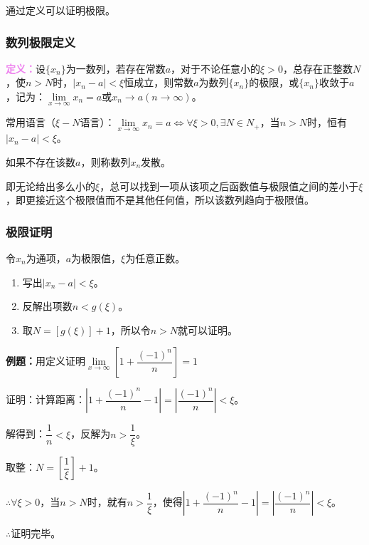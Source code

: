 \documentclass[UTF8, 12pt]{ctexart}
\begin{document}
        通过定义可以证明极限。

        \subsubsection{数列极限定义}

        \textcolor{violet}{\textbf{定义：}}设$\{x_n\}$为一数列，若存在常数$a$，对于不论任意小的$\xi>0$，总存在正整数$N$，使$n>N$时，$\vert x_n-a\vert<\xi$恒成立，则常数$a$为数列$\{x_n\}$的极限，或$\{x_n\}$收敛于$a$，记为：$\lim\limits_{x\to\infty}x_n=a$或$x_n\to a(n\to\infty)$。

        常用语言（$\xi-N$语言）：$\lim\limits_{x\to\infty}x_n=a\Leftrightarrow\forall\xi>0,\exists N\in N_+$，当$n>N$时，恒有$\vert x_n-a\vert<\xi$。

        如果不存在该数$a$，则称数列$x_n$发散。

        即无论给出多么小的$\xi$，总可以找到一项从该项之后函数值与极限值之间的差小于$\xi$，即更接近这个极限值而不是其他任何值，所以该数列趋向于极限值。

        \subsubsection{极限证明}

        令$x_n$为通项，$a$为极限值，$\xi$为任意正数。

        \begin{enumerate}
            \item 写出$\vert x_n-a|<\xi$。
            \item 反解出项数$n<g(\xi)$。
            \item 取$N=[g(\xi)]+1$，所以令$n>N$就可以证明。
        \end{enumerate}

        \textbf{例题：}用定义证明$\lim\limits_{x\to\infty}\left[1+\dfrac{(-1)^n}{n}\right]=1$

        证明：计算距离：$\left\vert 1+\dfrac{(-1)^n}{n}-1\right\vert=\left\vert\dfrac{(-1)^n}{n}\right\vert<\xi$。

        解得到：$\dfrac{1}{n}<\xi$，反解为$n>\dfrac{1}{\xi}$。

        取整：$N=\left[\dfrac{1}{\xi}\right]+1$。

        $\therefore\forall\xi>0$，当$n>N$时，就有$n>\dfrac{1}{\xi}$，使得$\left\vert 1+\dfrac{(-1)^n}{n}-1\right\vert=\left\vert\dfrac{(-1)^n}{n}\right\vert<\xi$。

        $\therefore$证明完毕。
\end{document}
